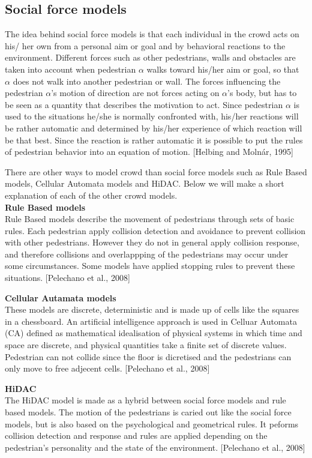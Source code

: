 \subsection{Social force models}
The idea behind social force models is that each individual in the crowd acts on his/ her own from a personal aim or goal and by behavioral reactions to
the environment. Different forces such as other pedestrians, walls and obstacles are taken into account when pedestrian $\alpha$ walks toward his/her aim or
goal, so that $\alpha$ does not walk into another pedestrian or wall. The forces influencing the pedestrian $\alpha$'s motion of direction are not forces
acting on $\alpha$'s body, but has to be seen as a quantity that describes the motivation to act.
Since pedestrian $\alpha$ is used to the situations he/she is normally confronted with, his/her reactions will be rather automatic and determined by his/her
experience of which reaction will be that best. Since the reaction is rather automatic it is possible to put the rules of pedestrian behavior into an
equation of motion. [Helbing and Molnár, 1995]

There are other ways to model crowd than social force models such as Rule Based models, Cellular Automata models and HiDAC. Below we will make a short
explanation of each of the other crowd models.
\\

\textbf{Rule Based models}\\
Rule Based models describe the movement of pedestrians through sets of basic rules. Each pedestrian apply collision detection and avoidance to prevent
collision with other pedestrians. However they do not in general apply collision response, and therefore collisions and overlappping of the pedestrians
may occur under some circumstances. Some models have applied stopping rules to prevent these situations. [Pelechano et al., 2008]

\textbf{Cellular Autamata models}\\
These models are discrete, deterministic and is made up of cells like the squares in a chessboard.
An artificial intelligence approach is used in Celluar Automata (CA) defined as mathematical idealisation of physical systems in which time and space are
discrete, and physical quantities take a finite set of discrete values. Pedestrian can not collide since the floor is dicretised and the pedestrians can
only move to free adjecent cells. [Pelechano et al., 2008]

\textbf{HiDAC}\\
The HiDAC model is made as a hybrid between social force models and rule based models. The motion of the pedestrians is caried out like the social force
models, but is also based on the psychological and geometrical rules. It peforms collision detection and response and rules are applied depending on the
pedestrian's personality and the state of the environment. [Pelechano et al., 2008]
\\
\\

